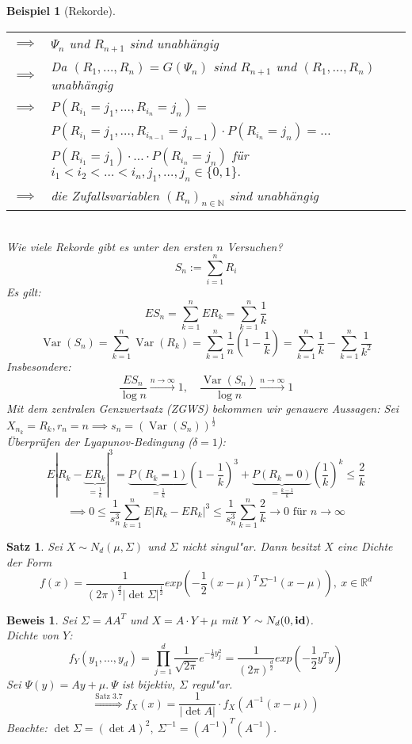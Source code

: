 \documentclass[a4paper,11pt]{book}
\newcommand{\R}{{\mathbb R}}
\newcommand{\N}{{\mathbb N}}
\newcommand{\id}{\text{\bf{id}}}
\DeclareMathOperator{\var}{Var}
\def\folgt{\ensuremath{\implies}}
\newtheorem{Sa}{Satz}[chapter]
\newtheorem{Bsp}{Beispiel}[chapter]
\theoremstyle{nonumberplain}
\newtheorem{Bew}{Beweis}
\begin{document}
\begin{Bsp}[Rekorde]
\begin{tabular}[b]{rp{}}
$\folgt$ & $\Psi_n$ und $R_{n+1}$ sind unabhängig\\
$\folgt$ & Da $(R_1, \ldots, R_n) = G(\Psi_n)$ sind $R_{n+1}$ und $(R_1,\ldots,R_n)$ unabhängig\\
$\folgt$& $P(R_{i_1}=j_1,\ldots,R_{i_n}=j_n) =$\\
&$P(R_{i_1}=j_1,\ldots,R_{i_{n-1}}=j_{n-1})\cdot P(R_{i_n}=j_n) = \ldots$\\
&$P(R_{i_1}=j_1)\cdot\ldots\cdot P(R_{i_n} = j_n)$ für $i_1<i_2<\ldots<i_n, j_1,\ldots,j_n\in\{0,1\}.$\\
$\folgt$ & die Zufallsvariablen $(R_n)_{n\in\N}$ sind unabhängig
\end{tabular}\\
Wie viele Rekorde gibt es unter den ersten $n$ Versuchen?
$$S_n:=\sum_{i=1}^n R_i$$
Es gilt:
$$ES_n = \sum_{k=1}^n ER_k = \sum_{k=1}^n \frac 1 k$$
$$\var(S_n) = \sum_{k=1}^n\var(R_k) = \sum_{k=1}^n\frac 1 n (1 - \frac 1 k ) = \sum_{k=1}^n\frac 1 k - \sum_{k=1}^n \frac 1 {k^2}$$
Insbesondere:
$$\frac{ES_n}{\log n}\stackrel{n\to\infty}{\to}1,\quad\frac{\var(S_n)}{\log n}\stackrel{n\to\infty}{\to}1$$
Mit dem zentralen Genzwertsatz (ZGWS) bekommen wir genauere Aussagen: Sei $X_{n_k} = R_k, r_n = n \folgt s_n = \left(\var(S_n)\right)^{\frac 1 2}$\\
Überprüfen der Lyapunov-Bedingung ($\delta = 1$):
$$E|R_k - \underbrace{ER_k}_{= \frac 1 k}|^3 = \underbrace{P(R_k=1)}_{=\frac 1 k}(1-\frac 1 k )^3 + \underbrace{P(R_k = 0)}_{=\frac {k-1} k}\left(\frac 1 k\right)^k\le\frac 2 k$$
$$\folgt 0\le\frac 1 {s_n^3}\sum_{k=1}^n E|R_k-ER_k|^3\le\frac 1 {s_n^3}\sum_{k=1}^n\frac 2 k\to 0 \text{ für } n\to\infty$$
\end{Bsp}


\begin{Sa} \label{Sa6.4}
Sei $X \sim N_d(\mu,\Sigma)$ und $\Sigma$ nicht singul"ar. Dann besitzt $X$ eine Dichte der Form
\[
f(x) = \frac1{(2\pi)^{\frac{d}2} |\det \Sigma|^{\frac12}} exp(-\frac12 (x-\mu)^T \Sigma^{-1}(x-\mu)),\ x \in \R^d
\]
\end{Sa}

\begin{Bew}
Sei $\Sigma = AA^T$ und $X = A \cdot Y + \mu$ mit $Y \sim N_d(0,\id)$.\\
Dichte von $Y$:
\[
f_Y (y_1,\dots,y_d) = \prod_{j=1}^d \frac1{\sqrt{2\pi}} e^{-\frac12 y_j^2} = \frac1{(2\pi)^{\frac{d}2}} exp(-\frac12 y^Ty)
\]
Sei $\Psi(y) = Ay + \mu.\ \Psi$ ist bijektiv, $\Sigma$ regul"ar.
\[
\stackrel{\text{Satz 3.7}}{\Rightarrow} f_X(x) = \frac1{|\det A|} \cdot f_X(A^{-1}(x-\mu))
\]
Beachte: $\det \Sigma = (\det A)^2,\ \Sigma^{-1} = (A^{-1})^T (A^{-1})$.
\end{Bew}
\end{document}
